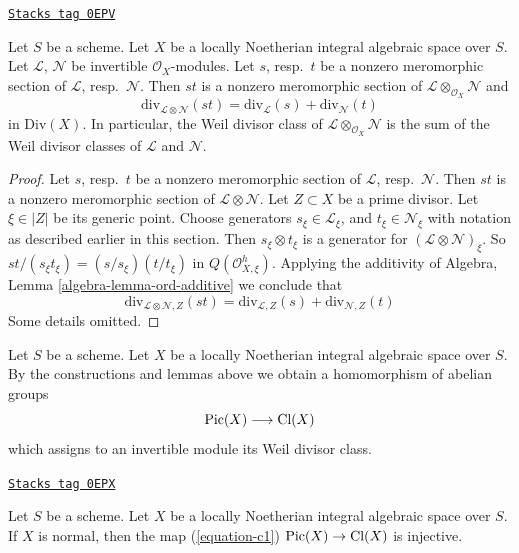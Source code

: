 \begin{lemma}[C1 additive]
\label{spaces-over-fields-lemma-c1-additive}
\href{https://stacks.math.columbia.edu/tag/0EPV}{\texttt{Stacks tag 0EPV}}

Let $S$ be a scheme. Let $X$ be a locally Noetherian integral algebraic space
over $S$. Let $\mathcal{L}$, $\mathcal{N}$ be invertible
$\mathcal{O}_X$-modules. Let $s$, resp.\ $t$ be a nonzero meromorphic section
of $\mathcal{L}$, resp.\ $\mathcal{N}$. Then $st$ is a nonzero
meromorphic section of $\mathcal{L} \otimes_{\mathcal{O}_X} \mathcal{N}$ and
$$
\text{div}_{\mathcal{L} \otimes \mathcal{N}}(st)
=
\text{div}_\mathcal{L}(s) + \text{div}_\mathcal{N}(t)
$$
in $\text{Div}(X)$. In particular, the Weil divisor class of
$\mathcal{L} \otimes_{\mathcal{O}_X} \mathcal{N}$ is the sum
of the Weil divisor classes of $\mathcal{L}$ and $\mathcal{N}$.
\end{lemma}

\begin{proof}
Let $s$, resp.\ $t$ be a nonzero meromorphic section
of $\mathcal{L}$, resp.\ $\mathcal{N}$. Then $st$ is a nonzero
meromorphic section of $\mathcal{L} \otimes \mathcal{N}$.
Let $Z \subset X$ be a prime divisor. Let $\xi \in |Z|$ be its generic
point. Choose generators $s_\xi \in \mathcal{L}_\xi$, and
$t_\xi \in \mathcal{N}_\xi$ with notation as described earlier
in this section. Then $s_\xi \otimes t_\xi$ is a generator
for $(\mathcal{L} \otimes \mathcal{N})_\xi$.
So $st/(s_\xi t_\xi) = (s/s_\xi)(t/t_\xi)$ in
$Q(\mathcal{O}_{X, \xi}^h)$. Applying the additivity of
Algebra, Lemma \ref{algebra-lemma-ord-additive}
we conclude that
$$
\text{div}_{\mathcal{L} \otimes \mathcal{N}, Z}(st)
=
\text{div}_{\mathcal{L}, Z}(s) + \text{div}_{\mathcal{N}, Z}(t)
$$
Some details omitted.
\end{proof}

Let $S$ be a scheme. Let $X$ be a locally Noetherian integral algebraic space
over $S$. By the constructions and lemmas above we obtain a homomorphism
of abelian groups
\begin{equation}
\label{equation-c1}
\operatorname{Pic}(X) \longrightarrow \text{Cl}(X)
\end{equation}
which assigns to an invertible module its Weil divisor class.

\begin{lemma}
\label{spaces-over-fields-lemma-normal-c1-injective}
\href{https://stacks.math.columbia.edu/tag/0EPX}{\texttt{Stacks tag 0EPX}}

Let $S$ be a scheme. Let $X$ be a locally Noetherian integral algebraic space
over $S$. If $X$ is normal, then the map (\ref{equation-c1})
$\operatorname{Pic}(X) \to \text{Cl}(X)$ is injective.
\end{lemma}

